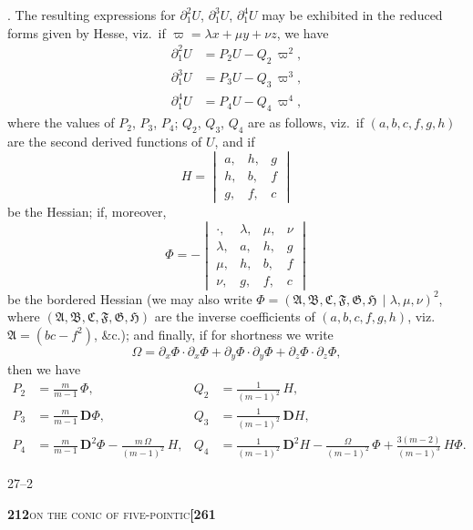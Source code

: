 \documentclass[11pt]{article}
\newcommand{\Cdel}{\mid}
\begin{document}
\medskip

. The resulting expressions for $\partial_1^2 U$, $\partial_1^3 U$, $\partial_1^4 U$ may be exhibited in the reduced forms given by Hesse, viz.\ if $\varpi = \lambda x + \mu y + \nu z$, we have
\[
\begin{aligned}
\partial_1^2 U &= P_2 U - Q_2\,\varpi^2,\\
\partial_1^3 U &= P_3 U - Q_3\,\varpi^3,\\
\partial_1^4 U &= P_4 U - Q_4\,\varpi^4,
\end{aligned}
\]
where the values of $P_2$, $P_3$, $P_4$; $Q_2$, $Q_3$, $Q_4$ are as follows, viz.\ if $(a, b, c, f, g, h)$ are the second derived functions of $U$, and if
\[
H = \begin{vmatrix} a, & h, & g\\ h, & b, & f\\ g, & f, & c \end{vmatrix}
\]
be the Hessian; if, moreover,
\[
\Phi = -\begin{vmatrix} \cdot, & \lambda, & \mu, & \nu\\ \lambda, & a, & h, & g\\ \mu, & h, & b, & f\\ \nu, & g, & f, & c \end{vmatrix}
\]
be the bordered Hessian (we may also write $\Phi = (\mathfrak{A}, \mathfrak{B}, \mathfrak{C}, \mathfrak{F}, \mathfrak{G}, \mathfrak{H}\,\Cdel\lambda, \mu, \nu)^2$, where $(\mathfrak{A}, \mathfrak{B}, \mathfrak{C}, \mathfrak{F}, \mathfrak{G}, \mathfrak{H})$ are the inverse coefficients of $(a, b, c, f, g, h)$, viz.\ $\mathfrak{A} = (bc - f^2)$, \&c.); and finally, if for shortness we write
\[
\Omega = \partial_x\Phi \cdot \partial_x\Phi + \partial_y\Phi \cdot \partial_y\Phi + \partial_z\Phi \cdot \partial_z\Phi,
\]
then we have
\[
\begin{aligned}
P_2 &= \frac{m}{m - 1}\,\Phi, & Q_2 &= \frac{1}{(m - 1)^2}\,H,\\[4pt]
P_3 &= \frac{m}{m - 1}\,\mathbf{D}\Phi, & Q_3 &= \frac{1}{(m - 1)^2}\,\mathbf{D}H,\\[4pt]
P_4 &= \frac{m}{m - 1}\,\mathbf{D}^2\Phi - \frac{m\,\Omega}{(m - 1)^2}\,H, &
Q_4 &= \frac{1}{(m - 1)^2}\,\mathbf{D}^2 H - \frac{\Omega}{(m - 1)^2}\,\Phi + \frac{3(m - 2)}{(m - 1)^3}\,H\Phi.
\end{aligned}
\]

\hfill 27--2

\newpage

\noindent\textbf{212}\hfill\textsc{on the conic of five-pointic}\hfill\textbf{[261}
\end{document}
